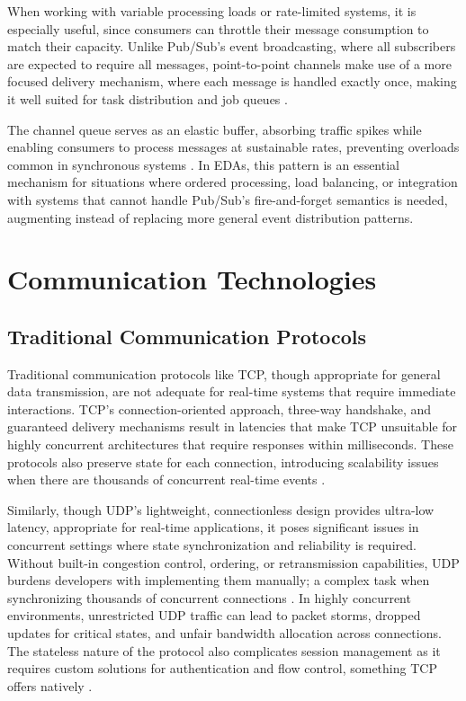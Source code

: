 \documentclass[]{final}
\begin{document}
When working with variable processing loads or rate-limited systems, it is
especially useful, since consumers can throttle their message consumption to
match their capacity. Unlike Pub/Sub's event broadcasting, where all
subscribers are expected to require all messages, point-to-point channels
make use of a more focused delivery mechanism, where each message is
handled exactly once, making it well suited for task distribution and
job queues \cite{noauthor_point--point_nodate}.

The channel queue serves as an elastic buffer, absorbing traffic spikes while
enabling consumers to process messages at sustainable rates, preventing
overloads common in synchronous systems \cite{noauthor_point--point_nodate}. In EDAs, this pattern is an
essential mechanism for situations where ordered processing, load balancing,
or integration with systems that cannot handle Pub/Sub's fire-and-forget
semantics is needed, augmenting instead of replacing more general event
distribution patterns.

\newpage

\section{Communication Technologies}

\subsection{Traditional Communication Protocols}

Traditional communication protocols like TCP, though appropriate for general
data transmission, are not adequate for real-time systems that require immediate
interactions. TCP's connection-oriented approach, three-way handshake, and
guaranteed delivery mechanisms result in latencies that make TCP unsuitable
for highly concurrent architectures that require responses within milliseconds.
These protocols also preserve state for each connection, introducing
scalability issues when there are thousands of concurrent real-time events \cite{kumar_survey_2012}.

Similarly, though UDP's lightweight, connectionless design provides ultra-low
latency, appropriate for real-time applications, it poses significant issues in
concurrent settings where state synchronization and reliability is required.
Without built-in congestion control, ordering, or retransmission capabilities,
UDP burdens developers with implementing them manually; a complex task when
synchronizing thousands of concurrent connections \cite{kumar_survey_2012}. In highly concurrent
environments, unrestricted UDP traffic can lead to packet storms, dropped
updates for critical states, and unfair bandwidth allocation across
connections. The stateless nature of the protocol also complicates session
management as it requires custom solutions for authentication and flow control,
something TCP offers natively \cite{kumar_survey_2012}.
\end{document}
